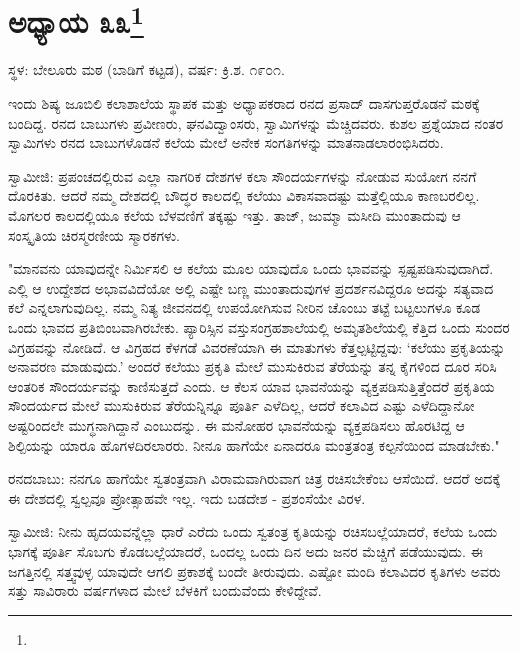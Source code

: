 \newpage

\chapter[ಅಧ್ಯಾಯ ೩೩]{ಅಧ್ಯಾಯ ೩೩\protect\footnote{}}

\begin{center}
ಸ್ಥಳ: ಬೇಲೂರು ಮಠ (ಬಾಡಿಗೆ ಕಟ್ಟಡ), ವರ್ಷ: ಕ್ರಿ.ಶ. ೧೯೦೧.
\end{center}

ಇಂದು ಶಿಷ್ಯ ಜೂಬಿಲಿ ಕಲಾಶಾಲೆಯ ಸ್ಥಾಪಕ ಮತ್ತು ಅಧ್ಯಾಪಕರಾದ ರನದ ಪ್ರಸಾದ್ ದಾಸಗುಪ್ತರೊಡನೆ ಮಠಕ್ಕೆ ಬಂದಿದ್ದ. ರನದ ಬಾಬುಗಳು ಪ್ರವೀಣರು, ಘನವಿದ್ವಾಂಸರು, ಸ್ವಾಮಿಗಳನ್ನು ಮೆಚ್ಚಿದವರು. ಕುಶಲ ಪ್ರಶ್ನೆಯಾದ ನಂತರ ಸ್ವಾಮಿಗಳು ರನದ ಬಾಬುಗಳೊಡನೆ ಕಲೆಯ ಮೇಲೆ ಅನೇಕ ಸಂಗತಿಗಳನ್ನು ಮಾತನಾಡಲಾರಂಭಿಸಿದರು.

ಸ್ವಾಮೀಜಿ: ಪ್ರಪಂಚದಲ್ಲಿರುವ ಎಲ್ಲಾ ನಾಗರಿಕ ದೇಶಗಳ ಕಲಾ ಸೌಂದರ್ಯಗಳನ್ನು ನೋಡುವ ಸುಯೋಗ ನನಗೆ ದೊರಕಿತು. ಆದರೆ ನಮ್ಮ ದೇಶದಲ್ಲಿ ಬೌದ್ಧರ ಕಾಲದಲ್ಲಿ ಕಲೆಯು ವಿಕಾಸವಾದಷ್ಟು ಮತ್ತೆಲ್ಲಿಯೂ ಕಾಣಬರಲಿಲ್ಲ. ಮೊಗಲರ ಕಾಲದಲ್ಲಿಯೂ ಕಲೆಯ ಬೆಳವಣಿಗೆ ತಕ್ಕಷ್ಟು ಇತ್ತು. ತಾಜ್, ಜುಮ್ಮಾ ಮಸೀದಿ ಮುಂತಾದುವು ಆ ಸಂಸ್ಕೃತಿಯ ಚಿರಸ್ಮರಣೀಯ ಸ್ಮಾರಕಗಳು.

"ಮಾನವನು ಯಾವುದನ್ನೇ ನಿರ್ಮಿಸಲಿ ಆ ಕಲೆಯ ಮೂಲ ಯಾವುದೊ ಒಂದು ಭಾವವನ್ನು ಸ್ಪಷ್ಟಪಡಿಸುವುದಾಗಿದೆ. ಎಲ್ಲಿ ಆ ಉದ್ದೇಶದ ಅಭಾವವಿದೆಯೋ ಅಲ್ಲಿ ಎಷ್ಟೇ ಬಣ್ಣ ಮುಂತಾದುವುಗಳ ಪ್ರದರ್ಶನವಿದ್ದರೂ ಅದನ್ನು ಸತ್ಯವಾದ ಕಲೆ ಎನ್ನಲಾಗುವುದಿಲ್ಲ. ನಮ್ಮ ನಿತ್ಯ ಜೀವನದಲ್ಲಿ ಉಪಯೋಗಿಸುವ ನೀರಿನ ಚೊಂಬು ತಟ್ಟೆ ಬಟ್ಟಲುಗಳೂ ಕೂಡ ಒಂದು ಭಾವದ ಪ್ರತಿಬಿಂಬವಾಗಿರಬೇಕು. ಪ್ಯಾರಿಸ್ಸಿನ ವಸ್ತುಸಂಗ್ರಹಶಾಲೆಯಲ್ಲಿ ಅಮೃತಶಿಲೆಯಲ್ಲಿ ಕೆತ್ತಿದ ಒಂದು ಸುಂದರ ವಿಗ್ರಹವನ್ನು ನೋಡಿದೆ. ಆ ವಿಗ್ರಹದ ಕೆಳಗಡೆ ವಿವರಣೆಯಾಗಿ ಈ ಮಾತುಗಳು ಕೆತ್ತಲ್ಪಟ್ಟಿದ್ದವು: ‘ಕಲೆಯು ಪ್ರಕೃತಿಯನ್ನು ಅನಾವರಣ ಮಾಡುವುದು.’ ಅಂದರೆ ಕಲೆಯು ಪ್ರಕೃತಿ ಮೇಲೆ ಮುಸುಕಿರುವ ತೆರೆಯನ್ನು ತನ್ನ ಕೈಗಳಿಂದ ದೂರ ಸರಿಸಿ ಆಂತರಿಕ ಸೌಂದರ್ಯವನ್ನು ಕಾಣಿಸುತ್ತದೆ ಎಂದು. ಆ ಕೆಲಸ ಯಾವ ಭಾವನೆಯನ್ನು ವ್ಯಕ್ತಪಡಿಸುತ್ತಿತ್ತೆಂದರೆ ಪ್ರಕೃತಿಯ ಸೌಂದರ್ಯದ ಮೇಲೆ ಮುಸುಕಿರುವ ತೆರೆಯನ್ನಿನ್ನೂ ಪೂರ್ತಿ ಎಳೆದಿಲ್ಲ, ಆದರೆ ಕಲಾವಿದ ಎಷ್ಟು ಎಳೆದಿದ್ದಾನೋ ಅಷ್ಟರಿಂದಲೇ ಮುಗ್ಧನಾಗಿದ್ದಾನೆ ಎಂಬುದನ್ನು. ಈ ಮನೋಹರ ಭಾವನೆಯನ್ನು ವ್ಯಕ್ತಪಡಿಸಲು ಹೊರಟಿದ್ದ ಆ ಶಿಲ್ಪಿಯನ್ನು ಯಾರೂ ಹೊಗಳದಿರಲಾರರು. ನೀನೂ ಹಾಗೆಯೇ ಏನಾದರೂ ಮಂತ್ರತಂತ್ರ ಕಲ್ಪನೆಯಿಂದ ಮಾಡಬೇಕು."

ರನದಬಾಬು: ನನಗೂ ಹಾಗೆಯೇ ಸ್ವತಂತ್ರವಾಗಿ ವಿರಾಮವಾಗಿರುವಾಗ ಚಿತ್ರ ರಚಿಸಬೇಕೆಂಬ ಆಸೆಯಿದೆ. ಆದರೆ ಅದಕ್ಕೆ ಈ ದೇಶದಲ್ಲಿ ಸ್ವಲ್ಪವೂ ಪ್ರೋತ್ಸಾಹವೇ ಇಲ್ಲ. ಇದು ಬಡದೇಶ - ಪ್ರಶಂಸೆಯೇ ವಿರಳ.

ಸ್ವಾಮೀಜಿ: ನೀನು ಹೃದಯವನ್ನೆಲ್ಲಾ ಧಾರೆ ಎರೆದು ಒಂದು ಸ್ವತಂತ್ರ ಕೃತಿಯನ್ನು ರಚಿಸಬಲ್ಲೆಯಾದರೆ, ಕಲೆಯ ಒಂದು ಭಾಗಕ್ಕೆ ಪೂರ್ತಿ ಸೊಬಗು ಕೊಡಬಲ್ಲೆಯಾದರೆ, ಒಂದಲ್ಲ ಒಂದು ದಿನ ಅದು ಜನರ ಮೆಚ್ಚಿಗೆ ಪಡೆಯುವುದು. ಈ ಜಗತ್ತಿನಲ್ಲಿ ಸತ್ತ್ವವುಳ್ಳ ಯಾವುದೇ ಆಗಲಿ ಪ್ರಕಾಶಕ್ಕೆ ಬಂದೇ ತೀರುವುದು. ಎಷ್ಟೋ ಮಂದಿ ಕಲಾವಿದರ ಕೃತಿಗಳು ಅವರು ಸತ್ತು ಸಾವಿರಾರು ವರ್ಷಗಳಾದ ಮೇಲೆ ಬೆಳಕಿಗೆ ಬಂದುವೆಂದು ಕೇಳಿದ್ದೇವೆ.

